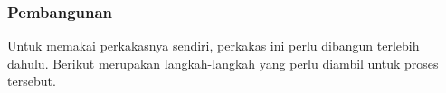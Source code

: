 \begin{comment}
Untuk dapat menjalankan perkakas ini, pengguna harus menginstal sebuah \textit{compiler} bahasa C, vcpkg (untuk Windows), serta dua buah \textit{library} umum yang telah didaftarkan di subbab \ref{sec:testing-specs-software}, yaitu:

\begin{itemize}
	\item cURL, dan
	\item cmake.
\end{itemize}
\noindent
Perlu diperhatikan bahwa \textit{library} cURL perlu diinstal melalui vcpkg, untuk menghindari masalah kompatibilitas akibat versi cURL yang tidak sesuai dengan yang dibutuhkan. Penggunaan vcpkg akan menghindari terjadinya masalah ini karena seluruh \textit{library} di vcpkg selalu diperbarui ke versi terbarunya.

Adapun perkakas ini juga membutuhkan adanya \textit{package} tambahan yang spesifik untuk Linux, yaitu:

\begin{itemize}
	\item libcurl4-openssl-dev (\textit{library development} cURL), dan
	\item GNU Make (opsional).
\end{itemize}

Perkakas ini juga menggunakan \textit{library} cJSON, tetapi untuk alasan kompatibilitas antar Windows dan Linux, \textit{library} ini langsung diikutkan di dalam perkakasnya sendiri, sehingga tidak perlu diinstal oleh pengguna lagi.
\end{comment}

\subsubsection{Pembangunan}
\label{sec:testing-implementation-usage-build}

Untuk memakai perkakasnya sendiri, perkakas ini perlu dibangun terlebih dahulu. Berikut merupakan langkah-langkah yang perlu diambil untuk proses tersebut.

